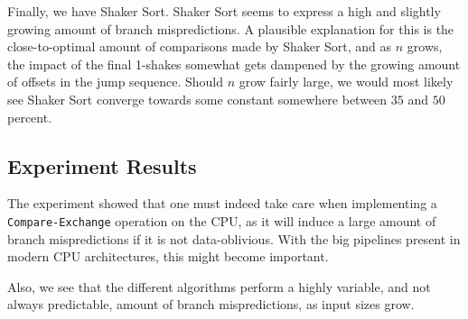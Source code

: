 Finally, we have Shaker Sort. Shaker Sort seems to express a high and slightly growing amount of branch mispredictions. A plausible explanation for this is the close-to-optimal amount of comparisons made by Shaker Sort, and as $n$ grows, the impact of the final 1-shakes somewhat gets dampened by the growing amount of offsets in the jump sequence. Should $n$ grow fairly large, we would most likely see Shaker Sort converge towards some constant somewhere between $35$ and $50$ percent. 

\subsection{Experiment Results}

The experiment showed that one must indeed take care when implementing a \texttt{Compare-Exchange} operation on the CPU, as it will induce a large amount of branch mispredictions if it is not data-oblivious. With the big pipelines present in modern CPU architectures, this might become important.

Also, we see that the different algorithms perform a highly variable, and not always predictable, amount of branch mispredictions, as input sizes grow.